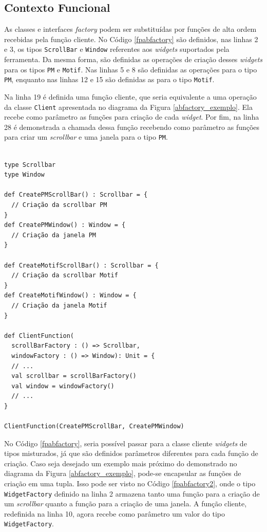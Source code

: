 \subsection*{Contexto Funcional}

As classes e interfaces \textit{factory} podem 
ser substituídas por funções de alta ordem 
recebidas pela função cliente. 
No Código \ref{fpabfactory} são definidos, 
nas linhas 2 e 3,  
os tipos \texttt{ScrollBar} e \texttt{Window} referentes aos 
\textit{widgets} suportados pela ferramenta. 
Da mesma forma, são definidas as operações de 
criação desses \textit{widgets} para os tipos 
\texttt{PM} e \texttt{Motif}. Nas linhas 5 e 8 são definidas as 
operações para o tipo \texttt{PM}, enquanto nas linhas 
12 e 15 são definidas as para o tipo \texttt{Motif}. 

Na linha 19 é definida uma função cliente, 
que seria equivalente a uma operação da classe 
\texttt{Client} apresentada no diagrama da Figura 
\ref{abfactory_exemplo}. Ela 
recebe como parâmetro as funções para criação de 
cada \textit{widget}. Por fim, na linha 28 é 
demonstrada a chamada dessa função recebendo 
como parâmetro as funções para criar um 
\textit{scrollbar} e uma janela para o tipo 
\texttt{PM}.

\begin{lstlisting}[caption={\textit{Abstract Factory} Funcional.},label=fpabfactory]
    
type Scrollbar
type Window

def CreatePMScrollBar() : Scrollbar = {
  // Criação da scrollbar PM
}
def CreatePMWindow() : Window = {
  // Criação da janela PM
}

def CreateMotifScrollBar() : Scrollbar = {
  // Criação da scrollbar Motif
}
def CreateMotifWindow() : Window = {
  // Criação da janela Motif
}

def ClientFunction(
  scrollBarFactory : () => Scrollbar, 
  windowFactory : () => Window): Unit = {
  // ...
  val scrollbar = scrollBarFactory()
  val window = windowFactory()
  // ...
}

ClientFunction(CreatePMScrollBar, CreatePMWindow)

\end{lstlisting}

No Código \ref{fpabfactory}, seria possível passar 
para a classe cliente \textit{widgets} de tipos 
misturados, já que são definidos parâmetros 
diferentes para cada função de criação. Caso 
seja desejado um exemplo mais próximo do demonstrado 
no diagrama da Figura \ref{abfactory_exemplo}, 
pode-se encapsular as funções de criação 
em uma tupla. Isso pode ser visto no Código 
\ref{fpabfactory2}, onde o tipo \texttt{WidgetFactory} 
definido na linha 2 armazena tanto uma função 
para a criação de um \textit{scrollbar} quanto a função 
para a criação de uma janela. A função 
cliente, redefinida na linha 10, agora 
recebe como parâmetro um valor do tipo 
\texttt{WidgetFactory}.

